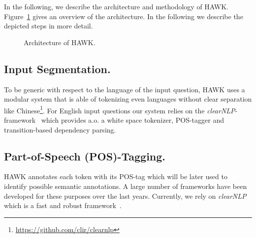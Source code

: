 In the following, we describe the architecture and methodology of HAWK. 
Figure~\ref{fig:hawk_pipeline} gives an overview of the architecture. In the following we describe the depicted steps in more detail.%

\begin{figure}[tb!]
\centering

\caption{Architecture of HAWK.}
\label{fig:hawk_pipeline}
\end{figure}

\subsection{Input Segmentation.} 
To be generic with respect to the language of the input question, HAWK uses a modular system that is able of tokenizing even languages without clear separation like Chinese\footnote{\url{https://github.com/clir/clearnlp}}.
For English input questions our system relies on the \emph{clearNLP}-framework~\cite{choi2011getting} which provides a.o. a white space tokenizer, POS-tagger and transition-based dependency parsing.

\subsection{Part-of-Speech (POS)-Tagging.} 
HAWK annotates each token with its POS-tag which will be later used to identify possible semantic annotations. 
A large number of frameworks have been developed for these purposes over the last years. 
Currently, we rely on \emph{clearNLP}~\cite{choi2011getting} which is a fast and robust framework~\cite{choi-palmer:2012:ACL2012short}.


